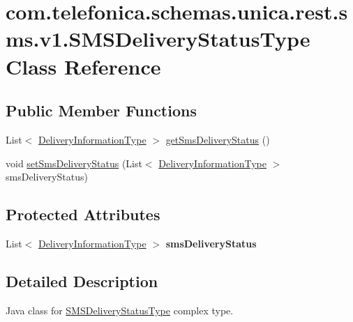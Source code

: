 \hypertarget{classcom_1_1telefonica_1_1schemas_1_1unica_1_1rest_1_1sms_1_1v1_1_1SMSDeliveryStatusType}{
\section{com.telefonica.schemas.unica.rest.sms.v1.SMSDeliveryStatusType Class Reference}
\label{classcom_1_1telefonica_1_1schemas_1_1unica_1_1rest_1_1sms_1_1v1_1_1SMSDeliveryStatusType}
}
\subsection*{Public Member Functions}
\begin{DoxyCompactItemize}
\item 
List$<$ \hyperlink{classcom_1_1telefonica_1_1schemas_1_1unica_1_1rest_1_1sms_1_1v1_1_1DeliveryInformationType}{DeliveryInformationType} $>$ \hyperlink{classcom_1_1telefonica_1_1schemas_1_1unica_1_1rest_1_1sms_1_1v1_1_1SMSDeliveryStatusType_ac51bf0f6c38ed5d5d10abe826f0eddde}{getSmsDeliveryStatus} ()
\item 
void \hyperlink{classcom_1_1telefonica_1_1schemas_1_1unica_1_1rest_1_1sms_1_1v1_1_1SMSDeliveryStatusType_adcc68547802f75937e6dd0030a094718}{setSmsDeliveryStatus} (List$<$ \hyperlink{classcom_1_1telefonica_1_1schemas_1_1unica_1_1rest_1_1sms_1_1v1_1_1DeliveryInformationType}{DeliveryInformationType} $>$ smsDeliveryStatus)
\end{DoxyCompactItemize}
\subsection*{Protected Attributes}
\begin{DoxyCompactItemize}
\item 
\hypertarget{classcom_1_1telefonica_1_1schemas_1_1unica_1_1rest_1_1sms_1_1v1_1_1SMSDeliveryStatusType_a47faa83f206ddb26fe36b7053f0d0091}{
List$<$ \hyperlink{classcom_1_1telefonica_1_1schemas_1_1unica_1_1rest_1_1sms_1_1v1_1_1DeliveryInformationType}{DeliveryInformationType} $>$ {\bfseries smsDeliveryStatus}}
\label{classcom_1_1telefonica_1_1schemas_1_1unica_1_1rest_1_1sms_1_1v1_1_1SMSDeliveryStatusType_a47faa83f206ddb26fe36b7053f0d0091}

\end{DoxyCompactItemize}


\subsection{Detailed Description}
Java class for \hyperlink{classcom_1_1telefonica_1_1schemas_1_1unica_1_1rest_1_1sms_1_1v1_1_1SMSDeliveryStatusType}{SMSDeliveryStatusType} complex type.

